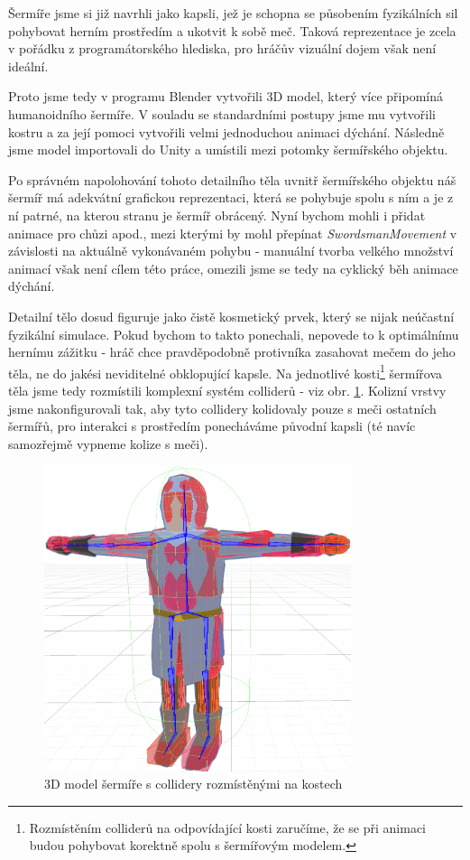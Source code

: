 Šermíře jsme si již navrhli jako kapsli, jež je schopna se působením fyzikálních sil pohybovat herním prostředím a ukotvit k sobě meč. Taková reprezentace je zcela v pořádku z programátorského hlediska, pro hráčův vizuální dojem však není ideální.

Proto jsme tedy v programu Blender \cite{Blender} vytvořili 3D model, který více připomíná humanoidního šermíře. V souladu se standardními postupy jsme mu vytvořili kostru a za její pomoci vytvořili velmi jednoduchou animaci dýchání. Následně jsme model importovali do Unity a umístili mezi potomky šermířského objektu.

Po správném napolohování tohoto detailního těla uvnitř šermířského objektu náš šermíř má adekvátní grafickou reprezentaci, která se pohybuje spolu s ním a je z ní patrné, na kterou stranu je šermíř obrácený. Nyní bychom mohli i přidat animace pro chůzi apod., mezi kterými by mohl přepínat \textit{SwordsmanMovement} v závislosti na aktuálně vykonávaném pohybu - manuální tvorba velkého množství animací však není cílem této práce, omezili jsme se tedy na cyklický běh animace dýchání. 

Detailní tělo dosud figuruje jako čistě kosmetický prvek, který se nijak neúčastní fyzikální simulace. Pokud bychom to takto ponechali, nepovede to k optimálnímu hernímu zážitku - hráč chce pravděpodobně protivníka zasahovat mečem do jeho těla, ne do jakési neviditelné obklopující kapsle. Na jednotlivé kosti\footnote{Rozmístěním colliderů na odpovídající kosti zaručíme, že se při animaci budou pohybovat korektně spolu s šermířovým modelem.} šermířova těla jsme tedy rozmístili komplexní systém colliderů - viz obr. \ref{obr05:swordsmanDetailedColliders}. Kolizní vrstvy jsme nakonfigurovali tak, aby tyto collidery kolidovaly pouze s meči ostatních šermířů, pro interakci s prostředím ponecháváme původní kapsli (té navíc samozřejmě vypneme kolize s meči). 

\begin{figure}[ht]\centering
  \center
  \includegraphics[width=90mm]{../img/swordsmanBodyColliders.png}
  \caption{3D model šermíře s collidery rozmístěnými na kostech}
  \label{obr05:swordsmanDetailedColliders}
\end{figure} 

